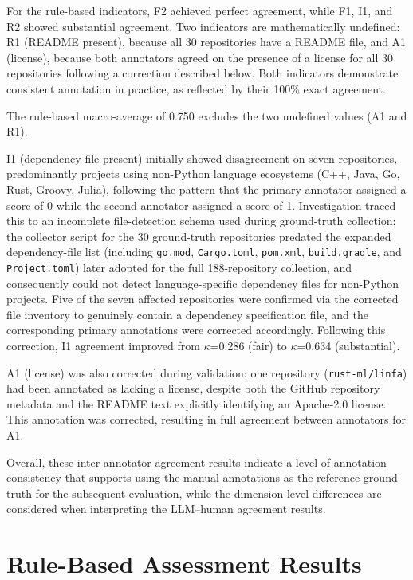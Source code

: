 For the rule-based indicators, F2 achieved perfect agreement, while 
F1, I1, and R2 showed substantial agreement. Two indicators are 
mathematically undefined: R1 (README present), because all 30 
repositories have a README file, and A1 (license), because both 
annotators agreed on the presence of a license for all 30 
repositories following a correction described below. Both indicators 
demonstrate consistent annotation in practice, as reflected by their 
100\% exact agreement.

The rule-based macro-average of 0.750 excludes the two undefined 
values (A1 and R1).

I1 (dependency file present) initially showed disagreement on seven 
repositories, predominantly projects using non-Python language 
ecosystems (C++, Java, Go, Rust, Groovy, Julia), following the 
pattern that the primary annotator assigned a score of 0 while the 
second annotator assigned a score of 1. Investigation traced this to 
an incomplete file-detection schema used during ground-truth 
collection: the collector script for the 30 ground-truth repositories 
predated the expanded dependency-file list (including 
\texttt{go.mod}, \texttt{Cargo.toml}, \texttt{pom.xml}, 
\texttt{build.gradle}, and \texttt{Project.toml}) later adopted for 
the full 188-repository collection, and consequently could not 
detect language-specific dependency files for non-Python projects. 
Five of the seven affected repositories were confirmed via the 
corrected file inventory to genuinely contain a dependency 
specification file, and the corresponding primary annotations were 
corrected accordingly. Following this correction, I1 agreement 
improved from $\kappa$=0.286 (fair) to $\kappa$=0.634 (substantial).

A1 (license) was also corrected during validation: one repository 
(\texttt{rust-ml/linfa}) had been annotated as lacking a license, 
despite both the GitHub repository metadata and the README text 
explicitly identifying an Apache-2.0 license. This annotation was 
corrected, resulting in full agreement between annotators for A1.

Overall, these inter-annotator agreement results indicate a level of
annotation consistency that supports using the manual annotations as
the reference ground truth for the subsequent evaluation, while the
dimension-level differences are considered when interpreting the
LLM--human agreement results.

\section{Rule-Based Assessment Results}

